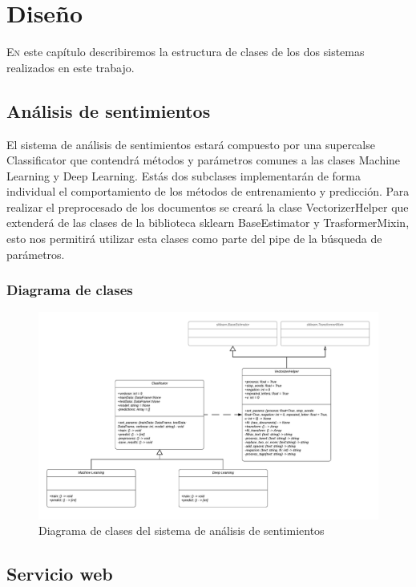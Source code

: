 
\chapter{Diseño}

\lettrine{E}{n} este capítulo describiremos la estructura de clases de los dos sistemas realizados en este trabajo.

\section{Análisis de sentimientos}

El sistema de análisis de sentimientos estará compuesto por una supercalse Classificator que contendrá métodos y parámetros comunes a las clases Machine Learning y Deep Learning. Estás dos subclases implementarán de forma individual el comportamiento de los métodos de entrenamiento y predicción. Para realizar el preprocesado de los documentos se creará la clase VectorizerHelper que extenderá de las clases de la biblioteca sklearn BaseEstimator y TrasformerMixin, esto nos permitirá utilizar esta clases como parte del pipe de la búsqueda de parámetros.

\subsection{Diagrama de clases}

\begin{figure}[H]
	\centering
	\includegraphics[width=1\textwidth]{imaxes/saClases.png}
	\caption{Diagrama de clases del sistema de análisis de sentimientos}
	\label{saClases}
\end{figure}

\section{Servicio web}

